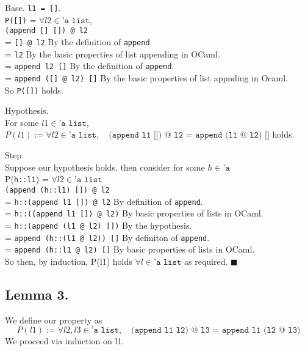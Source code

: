 \documentclass{article}
\begin{document}
\bigskip

\noindent
Base. \texttt{l1 = []}. \\
\indent \texttt{P([])} = $\forall l2 \in \texttt{'a list}$, \\
\indent \texttt{(append [] []) @ l2} \\
\indent = \texttt{[] @ l2} \qquad By the definition of \texttt{append}. \\
\indent = \texttt{l2} \qquad By the basic properties of list appending in OCaml. \\
\indent = \texttt{append l2 []} \qquad By the definition of \texttt{append}. \\
\indent = \texttt{append ([] @ l2) []} \qquad By the basic properties of list appnding in Ocaml. \\
\noindent So \texttt{P([])} holds.

\bigskip

\noindent
Hypothesis. \\
\indent For some $l1 \in \texttt{'a list}$, $P(l1) := \forall l2 \in \texttt{'a list}, \quad \texttt{(append l1 []) @ l2 = append (l1 @ l2) []}$ holds.

\bigskip

\noindent
Step. \\
Suppose our hypothesis holds, then consider for some $h \in \texttt{'a}$ \\
\indent P(\texttt{h::l1}) = $\forall l2 \in \texttt{'a list}$ \\
\indent \texttt{(append (h::l1) []) @ l2} \\
\indent = \texttt{h::(append l1 []) @ l2} \qquad By definition of \texttt{append}. \\
\indent = \texttt{h::((append l1 []) @ l2)} \qquad By basic properties of lists in OCaml. \\
\indent = \texttt{h::(append (l1 @ l2) [])} \qquad By the hypothesis. \\
\indent = \texttt{append (h::(l1 @ l2)) []} \qquad By definiton of \texttt{append}. \\
\indent = \texttt{append (h::l1 @ l2) []} \qquad By basic properties of lists in OCaml. \\
\noindent So then, by induction, P(l1) holds $\forall l \in \texttt{'a list}$ as
required. $\blacksquare$




\subsection {Lemma 3.}
We define our property as
\[ P(l1) := \forall l2,l3 \in \texttt{'a list}, \quad \texttt{(append l1 l2) @ l3 = append l1 (l2 @ l3)} \]
We proceed via induction on l1.
\end{document}

